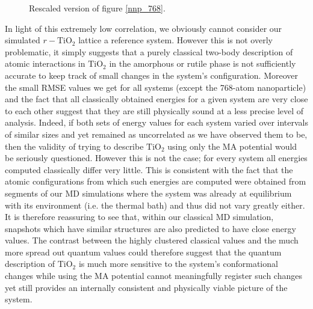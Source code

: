 \documentclass[aps,prb,twocolumn,amsmath,amssymb,superscriptaddress,longbibliography]{revtex4-1}
\begin{document}
\begin{figure}[htb]
\caption{Rescaled version of figure \ref{nnp_768}.}
\label{nnp_768d}
\end{figure}

In light of this extremely low correlation, we obviously cannot consider our simulated $r-\text{TiO}_2$ lattice a reference system. 
However this is not overly problematic, it simply suggests that a purely classical two-body description of atomic interactions in $\text{TiO}_2$ in the amorphous or rutile phase is not sufficiently accurate to keep track of small changes in the system's configuration.
Moreover the small RMSE values we get for all systems (except the 768-atom nanoparticle) and the fact that all classically obtained energies for a given system are very close to each other suggest that they are still physically sound at a less precise level of analysis.
Indeed, if both sets of energy values for each system varied over intervals of similar sizes and yet remained as uncorrelated as we have observed them to be, then the validity of trying to describe $\text{TiO}_2$ using only the MA potential would be seriously questioned.
However this is not the case; for every system all energies computed classically differ very little.
This is consistent with the fact that the atomic configurations from which such energies are computed were obtained from segments of our MD simulations where the system was already at equilibrium with its environment (i.e. the thermal bath) and thus did not vary greatly either.
It is therefore reassuring to see that, within our classical MD simulation, snapshots which have similar structures are also predicted to have close energy values. 
The contrast between the highly clustered classical values and the much more spread out quantum values could therefore suggest that the quantum description of $\text{TiO}_2$ is much more sensitive to the system's conformational changes while using the MA potential cannot meaningfully register such changes yet still provides an internally consistent and physically viable picture of the system.
\end{document}
